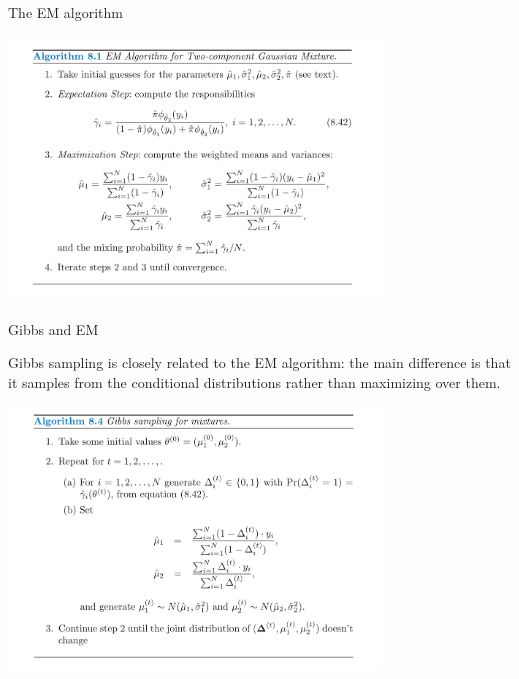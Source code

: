 \documentclass[
  ignorenonframetext,
]{beamer}
\begin{document}
\begin{frame}{The EM algorithm}
\protect\hypertarget{the-em-algorithm-1}{}

\begin{center}\includegraphics[height=7cm]{figures/ESL-Alg8-1} \end{center}

\end{frame}

\begin{frame}{Gibbs and EM}
\protect\hypertarget{gibbs-and-em}{}

Gibbs sampling is closely related to the EM algorithm: the main
difference is that it samples from the conditional distributions rather
than maximizing over them.

\begin{center}\includegraphics[height=7cm]{figures/ESL-Alg8-4} \end{center}

\end{frame}
\end{document}
